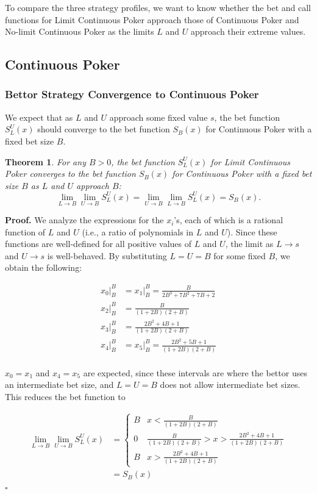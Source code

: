 \documentclass[a4paper,12pt]{article}
\theoremstyle{plain}
\newtheorem{theorem}{Theorem}[section]
\theoremstyle{definition}
\newenvironment{customproof}[1][Proof]{\noindent\textbf{#1.} }{\hfill$\square$\vspace{1em}}
\begin{document}
To compare the three strategy profiles, we want to know whether the bet and call functions for Limit Continuous Poker approach those of Continuous Poker and No-limit Continuous Poker as the limits $L$ and $U$ approach their extreme values.

\subsection{Continuous Poker}

\subsubsection{Bettor Strategy Convergence to Continuous Poker}
We expect that as $L$ and $U$ approach some fixed value $s$, the bet function $S_L^U(x)$ should converge to the bet function $S_B(x)$ for Continuous Poker with a fixed bet size $B$. 

\begin{theorem}
	 For any $B > 0$, the bet function $S_L^U(x)$ for Limit Continuous Poker converges to the bet function $S_B(x)$ for Continuous Poker with a fixed bet size $B$ as $L$ and $U$ approach $B$:
\[
\lim_{L \to B} \lim_{U \to B} S_L^U(x) = \lim_{U \to B} \lim_{L \to B} S_L^U(x) = S_B(x).
\]
\end{theorem}

\begin{customproof}
We analyze the expressions for the $x_i$'s, each of which is a rational function of $L$ and $U$ (i.e., a ratio of polynomials in $L$ and $U$). Since these functions are well-defined for all positive values of $L$ and $U$, the limit as $L \to s$ and $U \to s$ is well-behaved. By substituting $L = U = B$ for some fixed $B$, we obtain the following:

\begin{align*}
    x_0|_B^B & = x_1|_B^B = \frac{B}{2 B^3+7 B^2+7 B+2} \\
    x_2|_B^B & = \frac{B}{(1+2B)(2+B)} \\
    x_3|_B^B & = \frac{2 B^2+4 B+1}{(1+2B)(2+B)} \\
    x_4|_B^B & = x_5|_B^B = \frac{2 B^2+5 B+1}{(1+2B)(2+B)} \\
\end{align*}

$x_0 = x_1$ and $x_4 = x_5$ are expected, since these intervals are where the bettor uses an intermediate bet size, and $L=U=B$ does not allow intermediate bet sizes. This reduces the bet function to 

\begin{align*}
    \lim_{L \to B} \lim_{U \to B} S_L^U(x) & = \begin{cases}
    B & x < \frac{B}{(1+2B)(2+B)}\\
    0 & \frac{B}{(1+2B)(2+B)} > x > \frac{2 B^2+4 B+1}{(1+2B)(2+B)}\\
    B & x > \frac{2 B^2+4 B+1}{(1+2B)(2+B)}
    \end{cases}\\
    &= S_B(x)
\end{align*}
\end{customproof}
\end{document}
